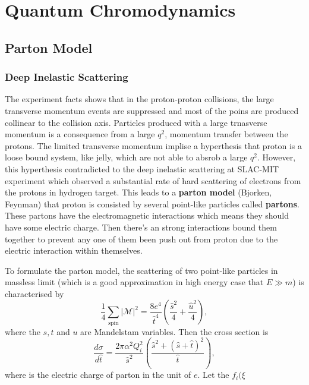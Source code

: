 \section{Quantum Chromodynamics}

\subsection{Parton Model}

\subsubsection{Deep Inelastic Scattering}
The experiment facts shows that in the proton-proton collisions, the large transverse momentum events are suppressed and most of the poins are produced collinear to the collision axis. Particles produced with a large trnasverse momentum is a consequence from a large $q^2$, momentum transfer between the protons. The limited transverse momentum implise a hyperthesis that proton is a loose bound system, like jelly, which are not able to absrob a large $q^2$. However, this hyperthesis contradicted to the deep inelastic scattering at SLAC-MIT experiment which observed a substantial rate of hard scattering of electrons from the protons in hydrogen target. This leads to a \textbf{parton model} (Bjorken, Feynman) that proton is consisted by several point-like particles called \textbf{partons}. These partons have the electromagnetic interactions which means they should have some electric charge. Then there's an strong interactions bound them together to prevent any one of them been push out from proton due to the electric interaction within themselves. 


To formulate the parton model, the scattering of two point-like particles in massless limit (which is a good approximation in high energy case that $E\gg m$) is characterised by
\begin{equation} 
\frac{1}{4}\sum_{\text{spin}}|\mathcal{M}|^2=\frac{8e^4}{\hat t^4}\left(\frac{\hat s^2}{4}+\frac{\hat u^2}{4}\right),
\end{equation}
where the $s,t$ and $u$ are Mandelstam variables. Then the cross section is
\begin{equation}
\frac{d\sigma}{d\hat t}=\frac{2\pi\alpha^2Q_i^2}{\hat s^2}\left(\frac{\hat s^2+(\hat s+\hat t)^2}{\hat t}\right),
\end{equation}
where is the electric charge of parton in the unit of $e$. Let the $f_i(\xi$ 